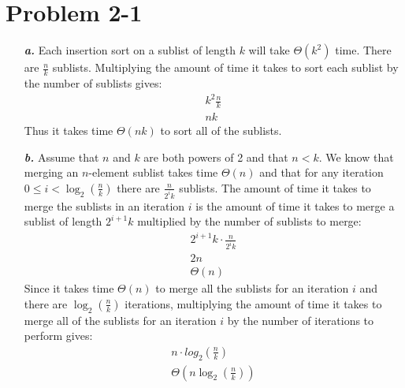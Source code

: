 \documentclass{article}
\begin{document}
\section*{Problem 2-1}

\noindent\begin{enumerate}
	\item[\textbf{\textit{a.}}] Each insertion sort on a sublist of length $k$ will take $\Theta(k^2)$ time. There are $\frac{n}{k}$ sublists. Multiplying the amount of time it takes to sort each sublist by the number of sublists gives:
	\begin{eqnarray*}
		k^2 \frac{n}{k} \\
		nk
	\end{eqnarray*}
	Thus it takes time $\Theta(nk)$ to sort all of the sublists.

	\item[\textbf{\textit{b.}}] Assume that $n$ and $k$ are both powers of 2 and that $n < k$. We know that merging an $n$-element sublist takes time $\Theta(n)$ and that for any iteration $0 \leq i < \log_2(\frac{n}{k})$ there are $\frac{n}{2^i k}$ sublists. The amount of time it takes to merge the sublists in an iteration $i$ is the amount of time it takes to merge a sublist of length $2^{i+1} k$ multiplied by the number of sublists to merge:
	\begin{eqnarray*}
		2^{i+1} k \cdot \frac{n}{2^i k} \\
		2n \\
		\Theta(n)
	\end{eqnarray*}
	Since it takes time $\Theta(n)$ to merge all the sublists for an iteration $i$ and there are $\log_2(\frac{n}{k})$ iterations, multiplying the amount of time it takes to merge all of the sublists for an iteration $i$ by the number of iterations to perform gives:
	\begin{eqnarray*}
		n \cdot log_2(\frac{n}{k}) \\
		\Theta(n \log_2(\frac{n}{k}))
	\end{eqnarray*}


\end{enumerate}
\end{document}
